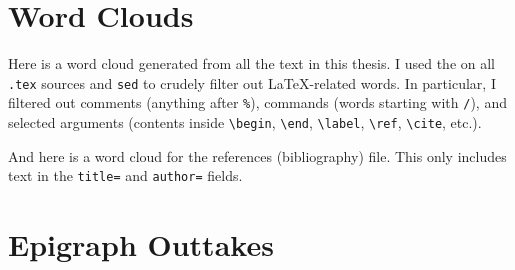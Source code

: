 
\section{Word Clouds}

Here is a word cloud generated from all the text in this thesis.
I used the  on all \verb|.tex| sources and \verb|sed| to crudely filter out LaTeX-related words. In particular, I filtered out comments (anything after \verb|%|), commands (words starting with \verb|/|), and selected arguments
(contents inside \verb|\begin|, \verb|\end|, \verb|\label|, \verb|\ref|, \verb|\cite|, etc.).


And here is a word cloud for the references (bibliography) file.
This only includes text in the \verb|title=| and \verb|author=| fields.


\section{Epigraph Outtakes}

